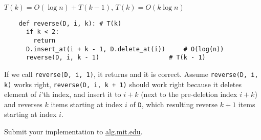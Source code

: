 \documentclass[12pt,twoside]{article}
\begin{document}
\begin{problems}
\begin{problemparts}
\end{problemparts}

\newpage
\problem  %

\begin{problemparts}
  \problempart %
  $T(k) = O(\log n) + T(k - 1)$, $T(k) = O(k\log n)$
  \begin{lstlisting}
    def reverse(D, i, k): # T(k)
      if k < 2:
        return
      D.insert_at(i + k - 1, D.delete_at(i))     # O(log(n))
      reverse(D, i, k - 1)                   # T(k - 1)
  \end{lstlisting}
  If we call \texttt{reverse(D, i, 1)}, it returns and it is correct.
  Assume \texttt{reverse(D, i, k)} works right, \texttt{reverse(D, i,
    k + 1)} should work right because it deletes element of $i$'th
  index, and insert it to $i + k$ (next to the pre-deletion index
  $i + k$) and reverses $k$ items starting at index $i$ of \texttt{D},
  which resulting reverse $k+1$ items starting at index $i$.
  
  \problempart %
  
\end{problemparts}

\newpage
\problem  %

\newpage
\problem  %

\begin{problemparts}
\problempart %
\problempart %
\problempart %
\problempart Submit your implementation to {\small\url{alg.mit.edu}}.
\end{problemparts}

\end{problems}
\end{document}

